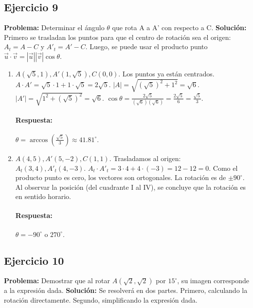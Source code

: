 \documentclass[12pt, letterpaper]{article}
\begin{document}
\subsection{Ejercicio 9}
\textbf{Problema:} Determinar el ángulo $\theta$ que rota A a A' con respecto a C.
\textbf{Solución:} Primero se trasladan los puntos para que el centro de rotación sea el origen: $A_t = A-C$ y $A'_t = A'-C$. Luego, se puede usar el producto punto $\vec{u} \cdot \vec{v} = |\vec{u}||\vec{v}|\cos\theta$.
\begin{enumerate}[label=\alph*)]
    \item $A(\sqrt{5},1), A'(1,\sqrt{5}), C(0,0)$. Los puntos ya están centrados.
    $A \cdot A' = \sqrt{5}\cdot 1 + 1\cdot\sqrt{5} = 2\sqrt{5}$.
    $|A| = \sqrt{(\sqrt{5})^2+1^2} = \sqrt{6}$. $|A'| = \sqrt{1^2+(\sqrt{5})^2} = \sqrt{6}$.
    $\cos\theta = \frac{2\sqrt{5}}{(\sqrt{6})(\sqrt{6})} = \frac{2\sqrt{5}}{6} = \frac{\sqrt{5}}{3}$.
    \paragraph{Respuesta:} $\theta = \arccos\left(\frac{\sqrt{5}}{3}\right) \approx 41.81^\circ$.
    
    \item $A(4,5), A'(5,-2), C(1,1)$. Trasladamos al origen: $A_t(3,4), A'_t(4,-3)$.
    $A_t \cdot A'_t = 3\cdot 4 + 4\cdot(-3) = 12-12=0$.
    Como el producto punto es cero, los vectores son ortogonales. La rotación es de $\pm 90^\circ$. Al observar la posición (del cuadrante I al IV), se concluye que la rotación es en sentido horario.
    \paragraph{Respuesta:} $\theta = -90^\circ$ o $270^\circ$.
\end{enumerate}

\subsection{Ejercicio 10}
\textbf{Problema:} Demostrar que al rotar $A(\sqrt{2}, \sqrt{2})$ por $15^\circ$, su imagen corresponde a la expresión dada.
\textbf{Solución:} Se resolverá en dos partes. Primero, calculando la rotación directamente. Segundo, simplificando la expresión dada.
\end{document}
